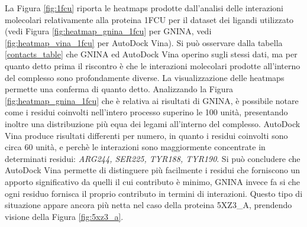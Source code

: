 La Figura \ref{fig:1fcu} riporta le heatmaps prodotte dall'analisi delle interazioni molecolari relativamente alla proteina 1FCU per il dataset dei ligandi utilizzato (vedi Figura \ref{fig:heatmap_gnina_1fcu} per GNINA, vedi \ref{fig:heatmap_vina_1fcu} per AutoDock Vina).\newline
Si può osservare dalla tabella \ref{contacts_table} che GNINA ed AutoDock Vina operino sugli stessi dati, ma per quanto detto prima il riscontro è che le interazioni molecolari prodotte all'interno del complesso sono profondamente diverse. La visualizzazione delle heatmaps permette una conferma di quanto detto. 
Analizzando la Figura \ref{fig:heatmap_gnina_1fcu} che è relativa ai risultati di GNINA, è possibile notare come i residui coinvolti nell'intero processo superino le 100 unità, presentando inoltre una distribuzione più equa dei legami all'interno del complesso.\newline
AutoDock Vina produce risultati differenti per numero, in quanto i residui coinvolti sono circa 60 unità, e perchè le interazioni sono maggiormente concentrate in determinati residui: \textit{ARG244, SER225, TYR188, TYR190}.\newline 
Si può concludere che AutoDock Vina permette di distinguere più facilmente i residui che forniscono un apporto significativo da quelli il cui contributo è minimo, GNINA invece fa si che ogni residuo fornisca il proprio contributo in termini di interazioni.\newline
Questo tipo di situazione appare ancora più netta nel caso della proteina 5XZ3\_A, prendendo visione della Figura \ref{fig:5xz3_a}. 

